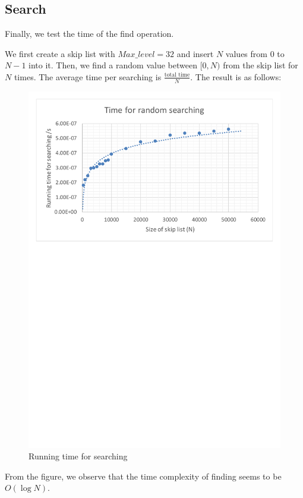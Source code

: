 \subsection{Search}
Finally, we test the time of the find operation.\par
We first create a skip list with $Max\_level=32$ and insert $N$ values from $0$ to $N-1$ into it. Then, we find a random value between $[0, N)$ from the skip list for $N$ times. The average time per searching is $\frac{\text{total time}}{N}$. The result is as follows:
\begin{figure}[H]
    \centering
    \includegraphics[width=\textwidth]{testing_results/search.pdf}
    \caption{Running time for searching}
\end{figure}
From the figure, we observe that the time complexity of finding seems to be $O(\log{N})$.